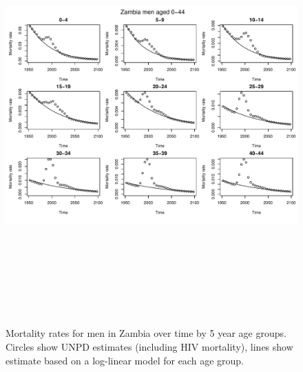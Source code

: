 \documentclass{article}
\begin{document}
\begin{figure}
\includegraphics[width=16cm,height=16cm]{EstimatingRatesFromUNPD-MortalityZamMen1} 

\caption{Mortality rates for men in Zambia over time by 5 year age groups. Circles show UNPD estimates (including HIV mortality), lines show estimate based on a log-linear model for each age group.}
\label{MortalitySAmen1}
\end{figure}
\end{document}
